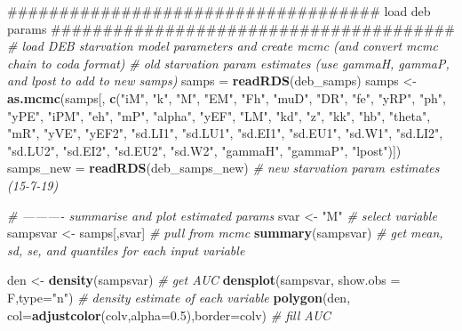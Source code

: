 \documentclass[10,portrait]{article}
\newenvironment{Shaded}{\begin{snugshade}}{\end{snugshade}}
\newcommand{\KeywordTok}[1]{\textcolor[rgb]{0.13,0.29,0.53}{\textbf{#1}}}
\newcommand{\DataTypeTok}[1]{\textcolor[rgb]{0.13,0.29,0.53}{#1}}
\newcommand{\FloatTok}[1]{\textcolor[rgb]{0.00,0.00,0.81}{#1}}
\newcommand{\StringTok}[1]{\textcolor[rgb]{0.31,0.60,0.02}{#1}}
\newcommand{\CommentTok}[1]{\textcolor[rgb]{0.56,0.35,0.01}{\textit{#1}}}
\newcommand{\NormalTok}[1]{#1}
\begin{document}
\begin{Shaded}
\begin{Highlighting}[]
\NormalTok{####################################  load deb params #######################################}
\CommentTok{# load DEB starvation model parameters and create mcmc (and convert mcmc chain to coda format)}
\CommentTok{# old starvation param estimates (use gammaH, gammaP, and lpost to add to new samps)}
\NormalTok{samps =}\StringTok{ }\KeywordTok{readRDS}\NormalTok{(deb_samps)}
\NormalTok{samps <-}\StringTok{ }\KeywordTok{as.mcmc}\NormalTok{(samps[, }\KeywordTok{c}\NormalTok{(}\StringTok{"iM"}\NormalTok{, }\StringTok{"k"}\NormalTok{, }\StringTok{"M"}\NormalTok{, }\StringTok{"EM"}\NormalTok{, }\StringTok{"Fh"}\NormalTok{, }\StringTok{"muD"}\NormalTok{, }\StringTok{"DR"}\NormalTok{, }\StringTok{"fe"}\NormalTok{, }\StringTok{"yRP"}\NormalTok{,}
                           \StringTok{"ph"}\NormalTok{, }\StringTok{"yPE"}\NormalTok{, }\StringTok{"iPM"}\NormalTok{, }\StringTok{"eh"}\NormalTok{, }\StringTok{"mP"}\NormalTok{, }\StringTok{"alpha"}\NormalTok{, }\StringTok{"yEF"}\NormalTok{, }\StringTok{"LM"}\NormalTok{,}
                           \StringTok{"kd"}\NormalTok{, }\StringTok{"z"}\NormalTok{, }\StringTok{"kk"}\NormalTok{, }\StringTok{"hb"}\NormalTok{, }\StringTok{"theta"}\NormalTok{, }\StringTok{"mR"}\NormalTok{, }\StringTok{"yVE"}\NormalTok{, }\StringTok{"yEF2"}\NormalTok{,}
                           \StringTok{"sd.LI1"}\NormalTok{, }\StringTok{"sd.LU1"}\NormalTok{, }\StringTok{"sd.EI1"}\NormalTok{, }\StringTok{"sd.EU1"}\NormalTok{, }\StringTok{"sd.W1"}\NormalTok{,  }\StringTok{"sd.LI2"}\NormalTok{,}
                           \StringTok{"sd.LU2"}\NormalTok{, }\StringTok{"sd.EI2"}\NormalTok{, }\StringTok{"sd.EU2"}\NormalTok{, }\StringTok{"sd.W2"}\NormalTok{, }\StringTok{"gammaH"}\NormalTok{, }\StringTok{"gammaP"}\NormalTok{, }\StringTok{"lpost"}\NormalTok{)])}
\NormalTok{samps_new =}\StringTok{ }\KeywordTok{readRDS}\NormalTok{(deb_samps_new) }\CommentTok{# new starvation param estimates (15-7-19)}

\CommentTok{# ---------- summarise and plot estimated params}
\NormalTok{svar <-}\StringTok{ "M"} \CommentTok{# select variable }
\NormalTok{sampsvar <-}\StringTok{ }\NormalTok{samps[,svar] }\CommentTok{# pull from mcmc}
\KeywordTok{summary}\NormalTok{(sampsvar) }\CommentTok{# get mean, sd, se, and quantiles for each input variable  }

\NormalTok{den <-}\StringTok{ }\KeywordTok{density}\NormalTok{(sampsvar) }\CommentTok{# get AUC}
\KeywordTok{densplot}\NormalTok{(sampsvar, }\DataTypeTok{show.obs =}\NormalTok{ F,}\DataTypeTok{type=}\StringTok{"n"}\NormalTok{) }\CommentTok{# density estimate of each variable}
\KeywordTok{polygon}\NormalTok{(den, }\DataTypeTok{col=}\KeywordTok{adjustcolor}\NormalTok{(colv,}\DataTypeTok{alpha=}\FloatTok{0.5}\NormalTok{),}\DataTypeTok{border=}\NormalTok{colv) }\CommentTok{# fill AUC }


\end{Highlighting}
\end{Shaded}
\end{document}
